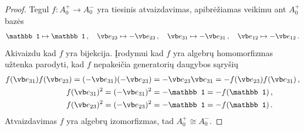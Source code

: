 \begin{proof}
Tegul $f:A^+_0 \to A^-_0$ yra tiesinis atvaizdavimas,
apibrėžiamas veikimu ant $A^+_0$ bazės
\begin{equation}
	\mathbb1 \mapsto \mathbb1
	\,,\quad
	\vb e_{23} \mapsto -\vb e_{23}
	\,,\quad
	\vb e_{31} \mapsto -\vb e_{31}
	\,,\quad
	\vb e_{12} \mapsto -\vb e_{12}
	\,.
\end{equation}
Akivaizdu kad $f$ yra bijekcija.
Įrodymui kad $f$ yra algebrų homomorfizmas užtenka parodyti,
kad $f$ nepakeičia generatorių daugybos sąryšių
\begin{equation}
	\begin{aligned}
		f(\vb e_{31}) f(\vb e_{23}) 
		=(-\vb e_{31})(-\vb e_{23}) 
		&= - \vb e_{23} \vb e_{31} 
		= - f(\vb e_{23}) f(\vb e_{31}) 
\,,\\
		f(\vb e_{31})^2 
		=(-\vb e_{31})^2 
		&= - \mathbb1
		= - f(\mathbb1)
\,,\\
		f(\vb e_{23})^2 
		=(-\vb e_{23})^2 
		&= - \mathbb1
		= - f(\mathbb1)
\,.
	\end{aligned}
\end{equation}
Atvaizdavimas $f$ yra algebrų izomorfizmas,
tad $A^+_0 \cong A^-_0$.
\end{proof}
